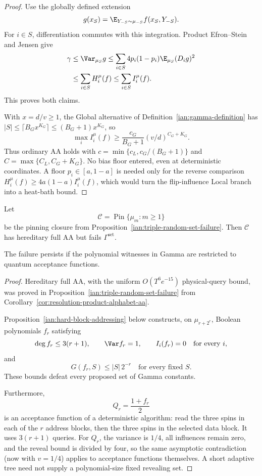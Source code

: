\begin{proof}
Use the globally defined extension
\[
 g(x_S)=\E_{Y_{-S}\sim\mu_{-S}}f(x_S,Y_{-S}).
\]
For \(i\in S\), differentiation commutes with this integration.
Product Efron--Stein and Jensen give
\[
 \begin{split}
 \gamma
 &\le\Var_{\mu_S}g
 \le\sum_{i\in S}4p_i(1-p_i)\E_{\mu_S}(D_ig)^2\\
 &\le\sum_{i\in S}H_i^\mu(f)
 \le\sum_{i\in S}I_i^\mu(f).
 \end{split}
\]
This proves both claims.

With \(x=d/v\ge1\), the Global alternative of
Definition~\ref{ian:gamma-definition} has
\(|S|\le\lceil B_Gx^{K_G}\rceil\le(B_G+1)x^{K_G}\), so
\[
 \max_i I_i^\mu(f)
 \ge\frac{c_G}{B_G+1}(v/d)^{C_G+K_G}.
\]
Thus ordinary AA holds with
\(c=\min\{c_L,c_G/(B_G+1)\}\) and \(C=\max\{C_L,C_G+K_G\}\).
No bias floor entered, even at deterministic coordinates. A floor
\(p_i\in[a,1-a]\) is needed only for the reverse comparison
\(H_i^\mu(f)\ge4a(1-a)I_i^\mu(f)\), which would turn the flip-influence
Local branch into a heat-bath bound.
\end{proof}

\begin{proposition}
\label{ian:gamma-set-not-necessary}
Let
\[
 \mathcal C=\operatorname{Pin}\{\mu_m:m\ge1\}
\]
be the pinning closure from
Proposition~\ref{ian:triple-random-set-failure}.
Then \(\mathcal C\) has hereditary full AA but fails
\(\Gamma^{\mathrm{set}}\).

The failure persists if the polynomial witnesses in Gamma are
restricted to quantum acceptance functions.
\end{proposition}

\begin{proof}
Hereditary full AA, with the uniform \(O(T^6e^{-15})\) physical-query
bound, was proved in Proposition~\ref{ian:triple-random-set-failure}
from Corollary~\ref{cor:resolution-product-alphabet-aa}.

Proposition~\ref{ian:hard-block-addressing} below constructs, on
\(\mu_{r+2^r}\), Boolean polynomials \(f_r\) satisfying
\[
 \deg f_r\le3(r+1),\qquad
 \Var f_r=1,\qquad
 I_i(f_r)=0\quad\text{for every }i,
\]
and
\[
 G(f_r,S)\le |S|\,2^{-r}
 \quad\text{for every fixed }S.
\]
These bounds defeat every proposed set of Gamma constants.

Furthermore,
\[
 Q_r=\frac{1+f_r}{2}
\]
is an acceptance function of a deterministic algorithm: read the
three spins in each of the \(r\) address blocks, then the three spins
in the selected data block. It uses \(3(r+1)\) queries.
For \(Q_r\), the variance is \(1/4\), all influences remain zero,
and the reveal bound is divided by four, so the same asymptotic
contradiction (now with \(v=1/4\)) applies to acceptance functions
themselves. A short adaptive tree need not supply a polynomial-size
fixed revealing set.
\end{proof}

